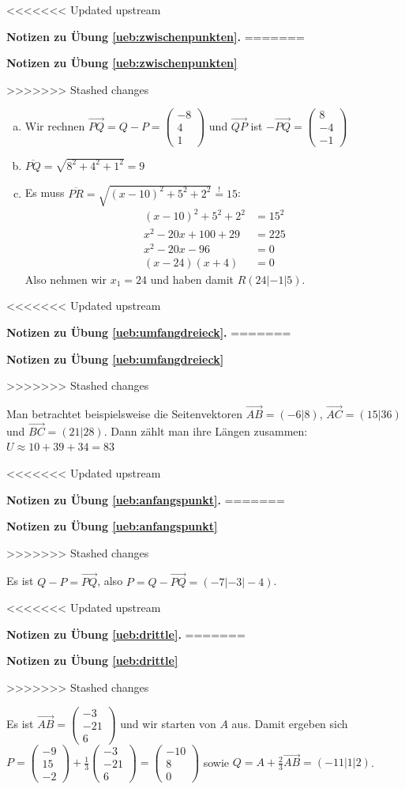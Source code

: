 \documentclass[%
11pt,%
twoside,%
titlepage,%
<<<<<<< Updated upstream
german,%
=======
swissgerman,%
>>>>>>> Stashed changes
headsepline%
]{scrartcl}
\newcommand{\faReturnGray}{\textcolor{gray}{\faMailReply}} %
\theoremstyle{definition}
\theoremstyle{plain}
\newcommand{\concatueb}[1]{ueb:#1}%
\newcommand{\concatlsg}[1]{lsg:#1}%
\newenvironment{lsg}[1]{%
<<<<<<< Updated upstream
    \par\noindent\textbf{Notizen zu Übung \ref{\concatueb{#1}}.}%
    \label{\concatlsg{#1}}
=======
    \par\noindent\textbf{Notizen zu Übung \ref{\concatueb{#1}}}\label{\concatlsg{#1}}
    \hfill\hyperref[\concatueb{#1}]{\faReturnGray}\par %
>>>>>>> Stashed changes
}{%
    \par%
}
\begin{document}
\begin{lsg}{zwischenpunkten}
    \begin{enumerate}[a)]
        \item Wir rechnen $\vec{PQ}=Q-P=\begin{pmatrix}
            -8\\4\\1
        \end{pmatrix}$ und $\vec{QP}$ ist $-\vec{PQ}=\begin{pmatrix}
            8\\-4\\-1
        \end{pmatrix}$
        \item $\overline{PQ}=\sqrt{8^2+4^2+1^2}=9$
        \item Es muss $\overline{PR}=\sqrt{(x-10)^2+5^2+2^2}\stackrel{!}{=}15$:
        \begin{align*}
            (x-10)^2+5^2+2^2 &= 15^2\\
            x^2-20x+100+29 &= 225\\
            x^2-20x-96 &= 0\\
            (x-24)(x+4) &= 0
        \end{align*}
        Also nehmen wir $x_1=24$ und haben damit $R(24|-1|5)$.
    \end{enumerate}
\end{lsg}
\begin{lsg}{umfangdreieck}
    Man betrachtet beispielsweise die Seitenvektoren $\vec{AB}=(-6|8)$, $\vec{AC}=(15|36)$ und $\vec{BC}=(21|28)$. Dann zählt man ihre Längen zusammen: $U\approx10+39+34=83$
\end{lsg}
\begin{lsg}{anfangspunkt}
    Es ist $Q-P=\vec{PQ}$, also $P=Q-\vec{PQ}=(-7|-3|-4)$.
\end{lsg}
\begin{lsg}{drittle}
    Es ist $\vec{AB}=\begin{pmatrix}
        -3\\-21\\6
    \end{pmatrix}$ und wir starten von $A$ aus. Damit ergeben sich $P=\begin{pmatrix}
        -9\\15\\-2
    \end{pmatrix}+\frac{1}{3}\begin{pmatrix}
        -3\\-21\\6
    \end{pmatrix}=\begin{pmatrix}
        -10\\8\\0
    \end{pmatrix}$ sowie $Q=A+\frac{2}{3}\vec{AB}=(-11|1|2)$. 
\end{lsg}
\end{document}

